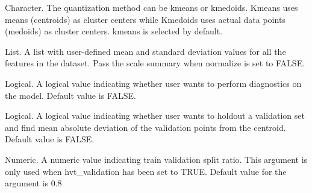\documentclass[letterpaper]{book}
\begin{document}
\begin{Arguments}
\begin{ldescription}
\item[\code{quant\_method}] Character. The quantization method can be kmeans or kmedoids. Kmeans uses means (centroids) as cluster centers
while Kmedoids uses actual data points (medoids) as cluster centers. kmeans is selected by default.

\item[\code{scale\_summary}] List. A list with user-defined mean and standard deviation values for all the features in the dataset. 
Pass the scale summary when normalize is set to FALSE.

\item[\code{diagnose}] Logical. A logical value indicating whether user wants to perform diagnostics on the model. 
Default value is FALSE.

\item[\code{hvt\_validation}] Logical. A logical value indicating whether user wants to holdout a validation set and find 
mean absolute deviation of the validation points from the centroid. Default value is FALSE.

\item[\code{train\_validation\_split\_ratio}] Numeric. A numeric value indicating train validation split ratio. 
This argument is only used when hvt\_validation has been set to TRUE. Default value for the argument is 0.8
\end{ldescription}
\end{Arguments}
%
\end{document}
